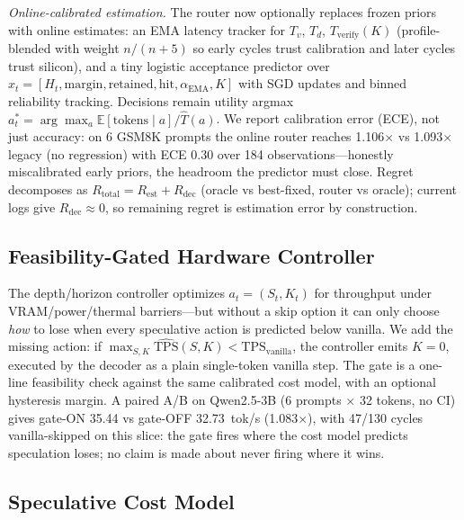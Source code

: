 \documentclass[10pt,twocolumn,letterpaper]{article}
\begin{document}
\textit{Online-calibrated estimation.} The router now optionally replaces frozen priors with online estimates: an EMA latency tracker for $T_v$, $T_d$, $T_{\mathrm{verify}}(K)$ (profile-blended with weight $n/(n{+}5)$ so early cycles trust calibration and later cycles trust silicon), and a tiny logistic acceptance predictor over $x_t{=}[H_t, \mathrm{margin}, \mathrm{retained}, \mathrm{hit}, \alpha_{\mathrm{EMA}}, K]$ with SGD updates and binned reliability tracking. Decisions remain utility argmax $a_t^*{=}\arg\max_a \mathbb{E}[\mathrm{tokens}\mid a]/\hat{T}(a)$. We report calibration error (ECE), not just accuracy: on 6 GSM8K prompts the online router reaches 1.106$\times$ vs 1.093$\times$ legacy (no regression) with ECE $0.30$ over 184 observations---honestly miscalibrated early priors, the headroom the predictor must close. Regret decomposes as $R_{\mathrm{total}}{=}R_{\mathrm{est}}{+}R_{\mathrm{dec}}$ (oracle vs best-fixed, router vs oracle); current logs give $R_{\mathrm{dec}}{\approx}0$, so remaining regret is estimation error by construction.

\subsection{Feasibility-Gated Hardware Controller}
\label{sec:gate}

The depth/horizon controller optimizes $a_t{=}(S_t,K_t)$ for throughput under VRAM/power/thermal barriers---but without a skip option it can only choose \textit{how} to lose when every speculative action is predicted below vanilla. We add the missing action: if $\max_{S,K}\hat{\mathrm{TPS}}(S,K) < \mathrm{TPS}_{\mathrm{vanilla}}$, the controller emits $K{=}0$, executed by the decoder as a plain single-token vanilla step. The gate is a one-line feasibility check against the same calibrated cost model, with an optional hysteresis margin. A paired A/B on Qwen2.5-3B (6 prompts $\times$ 32 tokens, no CI) gives gate-ON 35.44 vs gate-OFF 32.73~tok/s (1.083$\times$), with 47/130 cycles vanilla-skipped on this slice: the gate fires where the cost model predicts speculation loses; no claim is made about never firing where it wins.

\subsection{Speculative Cost Model}
\label{sec:roofline}
\end{document}
